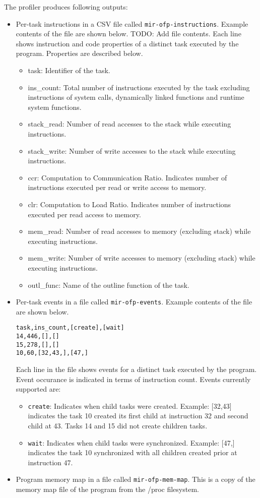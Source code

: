 \documentclass[11pt,a4paper]{article}
\begin{document}
The profiler produces following outputs: 
\begin{itemize}
    \item Per-task instructions in a CSV file called \texttt{mir-ofp-instructions}. Example contents of the file are shown below.  TODO: Add file contents.  Each line shows instruction and code properties of a distinct task executed by the program. Properties are described below.
        \begin{itemize}
            \item task: Identifier of the task.       
            \item ins\_count: Total number of instructions executed by the task excluding instructions of system calls, dynamically linked functions and runtime system functions.
            \item stack\_read: Number of read accesses to the stack while executing instructions.
            \item stack\_write: Number of write accesses to the stack while executing instructions.
            \item ccr: Computation to Communication Ratio. Indicates number of instructions executed per read or write access to memory.
            \item clr: Computation to Load Ratio. Indicates number of instructions executed per read access to memory.
            \item mem\_read: Number of read accesses to memory (excluding stack) while executing instructions.
            \item mem\_write: Number of write accesses to memory (excluding stack) while executing instructions.
            \item outl\_func: Name of the outline function of the task.
        \end{itemize}
    \item Per-task events in a file called \texttt{mir-ofp-events}. Example contents of the file are shown below. 
\begin{lstlisting}[style=MyInputStyle]
task,ins_count,[create],[wait]
14,446,[],[]
15,278,[],[]
10,60,[32,43,],[47,]
\end{lstlisting}
        Each line in the file shows events for a distinct task executed by the program. Event occurance is indicated in terms of instruction count. Events currently supported are: 
        \begin{itemize}
            \item \texttt{create}: Indicates when child tasks were created. Example: [32,43] indicates the task 10 created its first child at instruction 32 and second child at 43. Tasks 14 and 15 did not create children tasks.
            \item \texttt{wait}: Indicates when child tasks were synchronized. Example: [47,] indicates the task 10 synchronized with all children created prior at instruction 47. 
        \end{itemize}
    \item Program memory map in a file called \texttt{mir-ofp-mem-map}. This is a copy of the memory map file of the program from the /proc filesystem.
\end{itemize}
\end{document}
